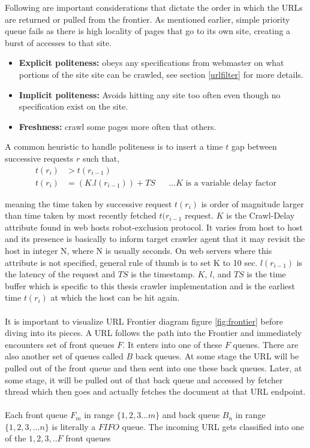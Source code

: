 \pagebreak

\noindent
Following are important considerations that dictate the order in which the URLs are returned or pulled from
the frontier. As mentioned earlier, simple priority queue fails as there is high locality of pages that go
to its own site, creating a burst of accesses to that site.

\begin{itemize}
\item \textbf{Explicit politeness:} obeys any specifications from webmaster on what portions of the site
  site can be crawled, see section \ref{urlfilter} for more details.
\item \textbf{Implicit politeness:} Avoids hitting any site too often even though no specification exist
  on the site.
  \item \textbf{Freshness:} crawl some pages more often that others.
\end{itemize}

\noindent
A common heuristic to handle politeness is to insert a time $t$ gap between successive requests $r$ such
that,
\begin{align*}
  t(r_i) &> t(r_{i-1}) \\
  t(r_i) &= (K.l(r_{i-1})) + TS && \text{...$K$ is a variable delay factor}
\end{align*}

\noindent
meaning the time taken by successive request $t(r_i)$ is order of magnitude larger than time taken by
most recently fetched $t(r_{i-1}$ request. $K$ is the Crawl-Delay attribute found in web hosts robot-exclusion protocol. It varies
from host to host and its presence is basically to inform target crawler agent that it may revisit the
host in integer N, where N is usually seconds. On web servers where this attribute is not specified,
general rule of thumb is to set K to 10 sec. $l(r_{i-1})$ is the latency of the request and $TS$ is the
timestamp. $K$, $l$, and $TS$ is the time buffer which is specific to this thesis crawler implementation
and is the earliest time $t(r_i)$ at which the host can be hit again.
\\
\\
\noindent
It is important to visualize URL Frontier diagram figure \ref{fig:frontier} before diving into its pieces. A URL follows the path into the Frontier and immediately encounters set of front queues $F$. It enters into one of these $F$ queues. There are also another set of queues called $B$ back queues. At some stage the URL will be pulled out of the front queue and then sent into one these back queues. Later, at some stage, it will be pulled out of that back queue and accessed by fetcher thread which then goes and actually fetches
the document at that URL endpoint.
\\
\\
\noindent
Each front queue $F_m$ in range $\{1,2,3...m\}$  and back queue $B_n$ in range $\{1,2,3,...n\}$ is literally a $FIFO$ queue. The incoming URL gets classified into one of the ${1,2,3,..F}$ front queues


